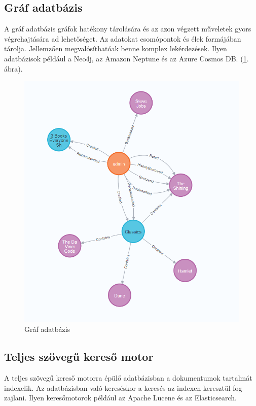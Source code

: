 \subsection{Gráf adatbázis}

A gráf adatbázis gráfok hatékony tárolására és az azon végzett műveletek gyors végrehajtására ad lehetőséget. Az adatokat csomópontok és élek formájában tárolja. Jellemzően megvalósíthatóak benne komplex lekérdezések. Ilyen adatbázisok például a Neo4j, az Amazon Neptune és az Azure Cosmos DB. (\ref{fig:graph}. ábra).

\begin{figure}[h]
    \centering
    \includegraphics[scale=0.5]{images/paradigms/graph.png}
    \caption{Gráf adatbázis}
    \label{fig:graph}
\end{figure}


\subsection{Teljes szövegű kereső motor}

A teljes szövegű kereső motorra épülő adatbázisban a dokumentumok tartalmát indexelik. Az adatbázisban való kereséskor a keresés az indexen keresztül fog zajlani. Ilyen keresőmotorok például az Apache Lucene és az Elasticsearch.

